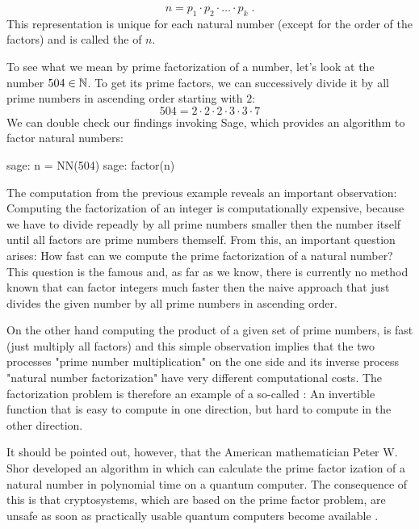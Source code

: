 \begin{equation}
\label{def:fundamental_theorem_arithmetics}
n = p_1 \cdot p_2 \cdot \ldots \cdot p_k \;.
\end{equation}
This representation is unique for each natural number (except for the order of the factors) and is called the  of $n$.
\begin{example}\label{ex-prime-factorization} To see what we mean by prime factorization of a number, let's look at the number $504\in\mathbb{N}$. To get its prime factors, we can successively divide it by all prime numbers in ascending order starting with $2$:
\begin{equation*}
504 = 2\cdot 2\cdot 2\cdot 3\cdot 3\cdot 7
\end{equation*}
We can double check our findings invoking Sage, which provides an algorithm to factor natural numbers:
\begin{sagecommandline}
sage: n = NN(504)
sage: factor(n)
\end{sagecommandline}
\end{example}
The computation from the previous example reveals an important observation: Computing the factorization of an integer is computationally expensive, because we have to divide repeadly by all prime numbers smaller then the number itself until all factors are prime numbers themself. From this, an important question arises: How fast can we compute the prime factorization of a natural number? This question is the famous  and, as far as we know, there is currently no method known that can factor integers much faster then the naive approach that just divides the given number by all prime numbers in ascending order.

On the other hand computing the product of a given set of prime numbers, is fast (just multiply all factors) and this simple observation implies that the two processes "prime number multiplication" on the one side and its inverse process "natural number factorization" have very different computational costs. The factorization problem is therefore an example of a so-called : An invertible function that is easy to compute in one direction, but hard to compute in the other direction. 

It should be pointed out, however, that the American mathematician Peter W. Shor developed an algorithm in \citeyear{shor94} which can calculate the prime factor ization of a natural number in polynomial time on a quantum computer. The consequence of this is that cryptosystems, which are based on the prime factor problem, are unsafe as soon as practically usable quantum computers become available .

